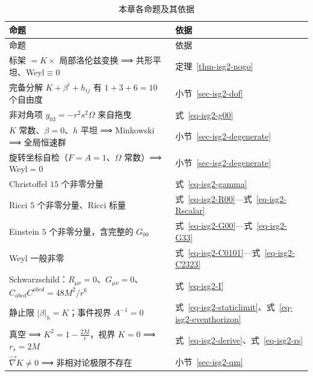\documentclass[
  chinese,
  a4paper,
  UTF8,
  12pt,
  oneside,
  openany]{ctexbook}
\theoremstyle{plain}
\theoremstyle{plain}
\theoremstyle{plain}
\theoremstyle{definition}
\theoremstyle{plain}
\theoremstyle{plain}
\theoremstyle{remark}
\begin{document}
\begin{longtable}[]{@{}
  >{\raggedright\arraybackslash}p{}
  >{\raggedright\arraybackslash}p{}@{}}
\caption{本章各命题及其依据}\label{tbl-isg2-conclusion}\tabularnewline
\toprule\noalign{}
\begin{minipage}[b]{\linewidth}\raggedright
命题
\end{minipage} & \begin{minipage}[b]{\linewidth}\raggedright
依据
\end{minipage} \\
\midrule\noalign{}
\endfirsthead
\toprule\noalign{}
\begin{minipage}[b]{\linewidth}\raggedright
命题
\end{minipage} & \begin{minipage}[b]{\linewidth}\raggedright
依据
\end{minipage} \\
\midrule\noalign{}
\endhead
\bottomrule\noalign{}
\endlastfoot
标架 \(=K\times\) 局部洛伦兹变换 ⟹ 共形平坦、Weyl\(\equiv0\) &
定理~\ref{thm-isg2-nogo} \\
完备分解 \(K+\beta^{i}+h_{ij}\) 有 \(1+3+6=10\) 个自由度 &
小节~\ref{sec-isg2-dof} \\
非对角项 \(g_{03}=-r^{2}s^{2}\Omega\) 来自拖曳 & 式~\ref{eq-isg2-g00} \\
\(K\) 常数、\(\beta=0\)、\(h\) 平坦 ⟹ Minkowski ⟹ 全局恒速群 &
小节~\ref{sec-isg2-degenerate} \\
旋转坐标自检（\(F=A=1\)、\(\Omega\) 常数）⟹ Weyl\(=0\) &
小节~\ref{sec-isg2-degenerate} \\
Christoffel \(15\) 个非零分量 & 式~\ref{eq-isg2-gamma} \\
Ricci \(5\) 个非零分量、Ricci 标量 &
式~\ref{eq-isg2-R00}---式~\ref{eq-isg2-Rscalar} \\
Einstein \(5\) 个非零分量，含完整的 \(G_{00}\) &
式~\ref{eq-isg2-G00}---式~\ref{eq-isg2-G33} \\
Weyl 一般非零 & 式~\ref{eq-isg2-C0101}---式~\ref{eq-isg2-C2323} \\
Schwarzschild：\(R_{\mu\nu}=0\)、\(G_{\mu\nu}=0\)、\(C_{abcd}C^{abcd}=48M^{2}/r^{6}\)
& 式~\ref{eq-isg2-I} \\
静止限 \(\lvert\beta\rvert_h=K\)；事件视界 \(A^{-1}=0\) &
式~\ref{eq-isg2-staticlimit}、式~\ref{eq-isg2-eventhorizon} \\
真空 ⟹ \(K^{2}=1-\frac{2M}{r}\)，视界 \(K=0\) ⟹ \(r_s=2M\) &
式~\ref{eq-isg2-derive}、式~\ref{eq-isg2-rs} \\
\(\vec\nabla K\neq0\) ⟹ 非相对论极限不存在 & 小节~\ref{sec-isg2-qm} \\
\end{longtable}
\end{document}
